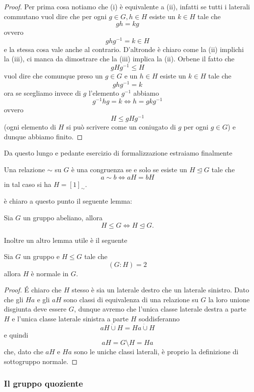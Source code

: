 \documentclass[11pt]{scrartcl}
\newcommand{\normal}{\mathrel{\unlhd}}
\begin{document}
	\begin{proof}
		Per prima cosa notiamo che (i) è equivalente a (ii), infatti se tutti i laterali commutano vuol dire che per ogni $g\in G,h\in H$ esiste un $k\in H$ tale che 
		$$gh=kg$$
		ovvero
		$$ghg^{-1}=k\in H$$
		e la stessa cosa vale anche al contrario. D'altronde è chiaro come la (ii) implichi la (iii), ci manca da dimostrare che la (iii) implica la (ii). Orbene il fatto che 
		$$gHg^{-1}\le H$$
		vuol dire che comunque preso un $g\in G$ e un $h\in H$ esiste un $k\in H$ tale che 
		$$ghg^{-1}=k$$
		ora se scegliamo invece di $g$ l'elemento $g^{-1}$ abbiamo
		$$g^{-1}hg=k \iff h=gkg^{-1}$$
		ovvero 
		$$H\le gHg^{-1}$$
		(ogni elemento di $H$ si può scrivere come un coniugato di $g$ per ogni $g\in G$) e dunque abbiamo finito.
	\end{proof}
	
	Da questo lungo e pedante esercizio di formalizzazione estraiamo finalmente
	\begin{corollary}
		Una relazione $\sim$ su $G$ è una congruenza se e solo se esiste un $H\normal G$ tale che 
		$$a\sim b \iff aH=bH$$
		in tal caso si ha $H=[1]_\sim$.
	\end{corollary}
	è chiaro a questo punto il seguente lemma:
	\begin{lemma}
		Sia $G$ un gruppo abeliano, allora
		$$H\le G \iff H\normal G. $$
	\end{lemma}
	Inoltre un altro lemma utile è il seguente
	\begin{lemma}
		Sia $G$ un gruppo e $H	\le G$ tale che 
		$$(G:H)=2$$
		allora $H$ è normale in $G$. 
	\end{lemma}
	\begin{proof}
		\'E chiaro che $H$ stesso è sia un laterale destro che un laterale sinistro. Dato che gli $Ha$ e gli $aH$ sono classi di equivalenza di una relazione su $G$ la loro unione disgiunta deve essere $G$, dunque avremo che l'unica classe laterale destra a parte $H$ e l'unica classe laterale sinistra a parte $H$ soddisferanno
		$$aH\dot{\cup}H=Ha\dot{\cup}H$$
		e quindi
		$$aH=G\setminus H = Ha$$
		che, dato che $aH$ e $Ha$ sono le uniche classi laterali, è proprio la definizione di sottogruppo normale.
	\end{proof}
	
	\subsubsection{Il gruppo quoziente}
	
\end{document}
